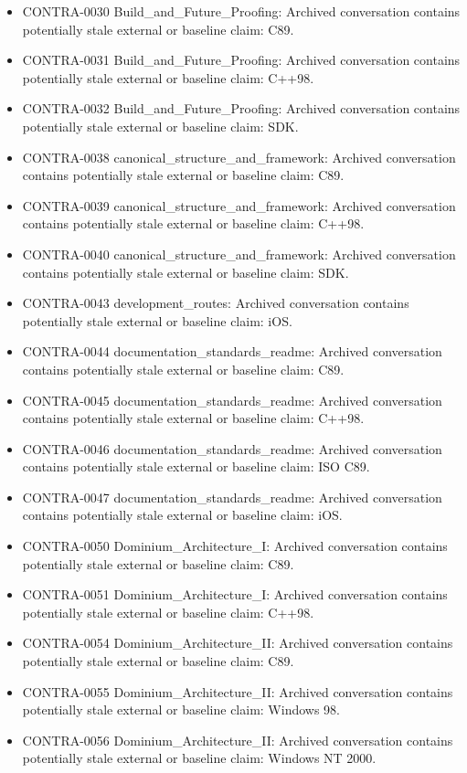 \documentclass[11pt,a4paper]{report}
\begin{document}
\begin{itemize}
\item CONTRA-0030 Build\_and\_Future\_Proofing: Archived conversation contains potentially stale external or baseline claim: C89.
\item CONTRA-0031 Build\_and\_Future\_Proofing: Archived conversation contains potentially stale external or baseline claim: C++98.
\item CONTRA-0032 Build\_and\_Future\_Proofing: Archived conversation contains potentially stale external or baseline claim: SDK.
\item CONTRA-0038 canonical\_structure\_and\_framework: Archived conversation contains potentially stale external or baseline claim: C89.
\item CONTRA-0039 canonical\_structure\_and\_framework: Archived conversation contains potentially stale external or baseline claim: C++98.
\item CONTRA-0040 canonical\_structure\_and\_framework: Archived conversation contains potentially stale external or baseline claim: SDK.
\item CONTRA-0043 development\_routes: Archived conversation contains potentially stale external or baseline claim: iOS.
\item CONTRA-0044 documentation\_standards\_readme: Archived conversation contains potentially stale external or baseline claim: C89.
\item CONTRA-0045 documentation\_standards\_readme: Archived conversation contains potentially stale external or baseline claim: C++98.
\item CONTRA-0046 documentation\_standards\_readme: Archived conversation contains potentially stale external or baseline claim: ISO C89.
\item CONTRA-0047 documentation\_standards\_readme: Archived conversation contains potentially stale external or baseline claim: iOS.
\item CONTRA-0050 Dominium\_Architecture\_I: Archived conversation contains potentially stale external or baseline claim: C89.
\item CONTRA-0051 Dominium\_Architecture\_I: Archived conversation contains potentially stale external or baseline claim: C++98.
\item CONTRA-0054 Dominium\_Architecture\_II: Archived conversation contains potentially stale external or baseline claim: C89.
\item CONTRA-0055 Dominium\_Architecture\_II: Archived conversation contains potentially stale external or baseline claim: Windows 98.
\item CONTRA-0056 Dominium\_Architecture\_II: Archived conversation contains potentially stale external or baseline claim: Windows NT 2000.

\end{itemize}
\end{document}
